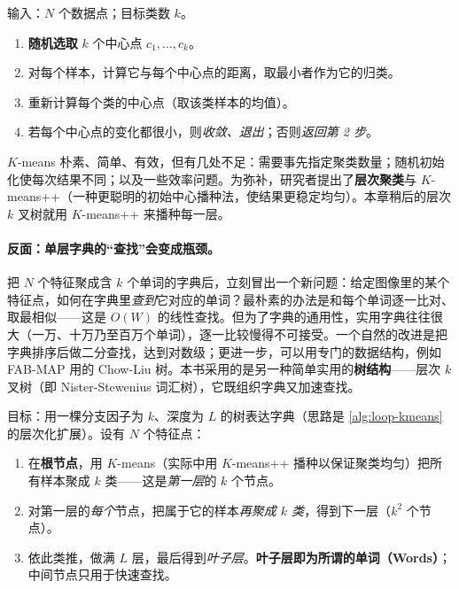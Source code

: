\begin{algo}[$K$-means 聚类]\label{alg:loop-kmeans}
输入：$N$ 个数据点；目标类数 $k$。
\begin{enumerate}
  \item \textbf{随机选取} $k$ 个中心点 $c_1,\dots,c_k$。
  \item 对每个样本，计算它与每个中心点的距离，取最小者作为它的归类。
  \item 重新计算每个类的中心点（取该类样本的均值）。
  \item 若每个中心点的变化都很小，则\emph{收敛、退出}；否则\emph{返回第 2 步}。
\end{enumerate}
\end{algo}

\noindent $K$-means 朴素、简单、有效，但有几处不足\cite{gaoxiang2019slam14}：需要事先指定聚类数量；随机初始化使每次结果不同；以及一些效率问题。为弥补，研究者提出了\textbf{层次聚类}与 $K$-means++（一种更聪明的初始中心播种法，使结果更稳定均匀）。本章稍后的层次 $k$ 叉树就用 $K$-means++ 来播种每一层。

\paragraph{反面：单层字典的“查找”会变成瓶颈。}
把 $N$ 个特征聚成含 $k$ 个单词的字典后，立刻冒出一个新问题\cite{gaoxiang2019slam14}：给定图像里的某个特征点，如何在字典里\emph{查到}它对应的单词？最朴素的办法是和每个单词逐一比对、取最相似——这是 $O(W)$ 的线性查找。但为了字典的通用性，实用字典往往很大（一万、十万乃至百万个单词），逐一比较慢得不可接受。一个自然的改进是把字典排序后做二分查找，达到对数级；更进一步，可以用专门的数据结构，例如 FAB-MAP\cite{cummins2008fabmap} 用的 Chow-Liu 树。本书采用的是另一种简单实用的\textbf{树结构}——层次 $k$ 叉树（即 Nister-Stewenius 词汇树\cite{nister2006scalable}），它既组织字典又加速查找。

\begin{algo}\label{alg:loop-ktree}
目标：用一棵分支因子为 $k$、深度为 $L$ 的树表达字典（思路是 \cref{alg:loop-kmeans} 的层次化扩展）。设有 $N$ 个特征点：
\begin{enumerate}
  \item 在\textbf{根节点}，用 $K$-means（实际中用 $K$-means++ 播种以保证聚类均匀）把所有样本聚成 $k$ 类——这是\emph{第一层}的 $k$ 个节点。
  \item 对第一层的\emph{每个}节点，把属于它的样本\emph{再聚成 $k$ 类}，得到下一层（$k^2$ 个节点）。
  \item 依此类推，做满 $L$ 层，最后得到\emph{叶子层}。\textbf{叶子层即为所谓的单词（Words）}；中间节点只用于快速查找。
\end{enumerate}
\end{algo}

